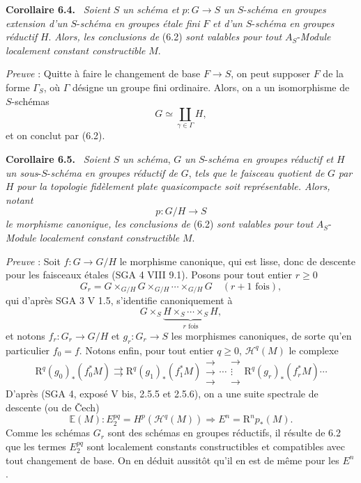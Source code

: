\documentclass[11pt]{article}
\newenvironment{statement}[1]{\par\medskip\noindent\textbf{#1.}\ }{\par\medskip}
\begin{document}
\begin{statement}{Corollaire 6.4}
\emph{Soient} $S$ \emph{un schéma et} $p:G\to S$ \emph{un} $S$-\emph{schéma en groupes extension d'un} $S$-\emph{schéma en groupes étale fini} $F$ \emph{et d'un} $S$-\emph{schéma en groupes réductif} $H$. \emph{Alors, les conclusions de} (6.2) \emph{sont valables pour tout} $A_S$-\emph{Module localement constant constructible} $M$.
\end{statement}

\emph{Preuve} : Quitte à faire le changement de base $F\to S$, on peut supposer $F$ de la forme $\Gamma_S$, où $\Gamma$ désigne un groupe fini ordinaire. Alors, on a un isomorphisme de $S$-schémas
\[
G\simeq\coprod_{\gamma\in\Gamma}H,
\]
et on conclut par (6.2).

\begin{statement}{Corollaire 6.5}
\emph{Soient} $S$ \emph{un schéma}, $G$ \emph{un} $S$-\emph{schéma en groupes réductif et} $H$ \emph{un sous}-$S$-\emph{schéma en groupes réductif de} $G$, \emph{tels que le faisceau quotient de} $G$ \emph{par} $H$ \emph{pour la topologie fidèlement plate quasicompacte soit représentable. Alors, notant}
\[
p:G/H\to S
\]
\emph{le morphisme canonique, les conclusions de} (6.2) \emph{sont valables pour tout} $A_S$-\emph{Module localement constant constructible} $M$.
\end{statement}

\emph{Preuve} : Soit $f:G\to G/H$ le morphisme canonique, qui est lisse, donc de descente pour les faisceaux étales (SGA 4 VIII 9.1). Posons pour tout entier $r\ge0$
\[
G_r=G\times_{G/H}G\times_{G/H}\cdots\times_{G/H}G
\quad(r+1\text{ fois}),
\]
qui d'après SGA 3 V 1.5, s'identifie canoniquement à
\[
G\times_S\underbrace{H\times_S\cdots\times_S H}_{r\text{ fois}},
\]
et notons $f_r:G_r\to G/H$ et $g_r:G_r\to S$ les morphismes canoniques, de sorte qu'en particulier $f_0=f$. Notons enfin, pour tout entier $q\ge0$, $\mathcal H^q(M)$ le complexe
\[
\mathrm{R}^q(g_0)_*(f_0^*M)\rightrightarrows \mathrm{R}^q(g_1)_*(f_1^*M)\mathrel{\substack{\to\\\to\\\to}}\cdots\mathrel{\substack{\to\\\vdots\\\to}} \mathrm{R}^q(g_r)_*(f_r^*M)\cdots
\]
D'après (SGA 4, exposé V bis, 2.5.5 et 2.5.6), on a une suite spectrale de descente (ou de Čech)
\[
\mathbb E(M):E_2^{pq}=H^p(\mathcal H^q(M))\Rightarrow E^n=\mathrm{R}^np_*(M).
\]
Comme les schémas $G_r$ sont des schémas en groupes réductifs, il résulte de 6.2 que les termes $E_2^{pq}$ sont localement constants constructibles et compatibles avec tout changement de base. On en déduit aussitôt qu'il en est de même pour les $E^n$.
\end{document}
